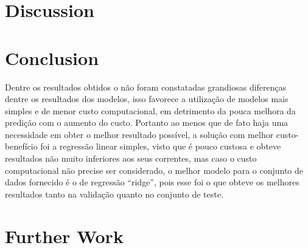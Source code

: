 \section{Discussion}


\section{Conclusion}
Dentre os resultados obtidos o não foram constatadas grandiosas diferenças dentre os resultados dos modelos, isso favorece a utilização de modelos mais simples e de menor custo computacional, em detrimento da pouca melhora da predição com o aumento do custo. Portanto ao menos que de fato haja uma necessidade em obter o melhor resultado possível, a solução com melhor custo-benefício foi a regressão linear simples, visto que é pouco custosa e obteve resultados não muito inferiores aos seus correntes, mas caso o custo computacional não precise ser considerado, o melhor modelo para o conjunto de dados fornecido é o de regressão ``ridge'', pois esse foi o que obteve os melhores resultados tanto na validação quanto no conjunto de teste.


\section{Further Work}
